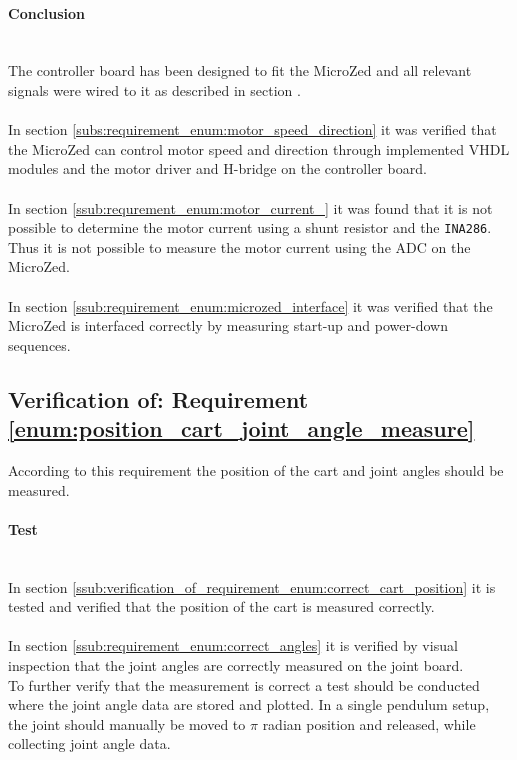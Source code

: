 \paragraph{Conclusion}~\\
The controller board has been designed to fit the MicroZed and all relevant signals were wired to it as described in section \label{sec:controller_board}.
\\~\\
In section \ref{subs:requirement_enum:motor_speed_direction} it was verified that the MicroZed can control motor speed and direction through implemented VHDL modules and the motor driver and H-bridge on the controller board. 
\\~\\
In section \ref{ssub:requrement_enum:motor_current_} it was found that it is not possible to determine the motor current using a shunt resistor and the \texttt{INA286}. 
Thus it is not possible to measure the motor current using the ADC on the MicroZed.
\\~\\
In section \ref{ssub:requirement_enum:microzed_interface} it was verified that the MicroZed is interfaced correctly by measuring start-up and power-down sequences.



\subsection{Verification of: Requirement \ref{enum:position_cart_joint_angle_measure}} %
\label{sub:verification_of_requirement_enum:position_cart_joint_angle_measure}
According to this requirement the position of the cart and joint angles should be measured.

\paragraph{Test}~\\
In section \ref{ssub:verification_of_requirement_enum:correct_cart_position} it is tested and verified that the position of the cart is measured correctly. 
\\~\\
In section \ref{ssub:requirement_enum:correct_angles} it is verified by visual inspection that the joint angles are correctly measured on the joint board.
\\
To further verify that the measurement is correct a test should be conducted where the joint angle data are stored and plotted.  
In a single pendulum setup, the joint should manually be moved to $\pi$ radian position and released, while collecting joint angle data.

